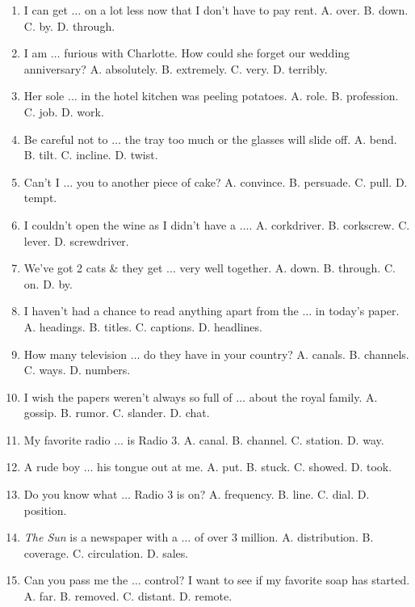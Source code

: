 \documentclass{article}
\numberwithin{equation}{section}
\begin{document}
\begin{enumerate}[leftmargin=8mm]
	\item I can get $\ldots$ on a lot less now that I don't have to pay rent. {\sf A.} over. {\sf B.} down. {\sf C.} by. {\sf D.} through.
	\item I am $\ldots$ furious with Charlotte. How could she forget our wedding anniversary? {\sf A.} absolutely. {\sf B.} extremely. {\sf C.} very. {\sf D.} terribly.
	\item Her sole $\ldots$ in the hotel kitchen was peeling potatoes. {\sf A.} role. {\sf B.} profession. {\sf C.} job. {\sf D.} work.
	\item Be careful not to $\ldots$ the tray too much or the glasses will slide off. {\sf A.} bend. {\sf B.} tilt. {\sf C.} incline. {\sf D.} twist.
	\item Can't I $\ldots$ you to another piece of cake? {\sf A.} convince. {\sf B.} persuade. {\sf C.} pull. {\sf D.} tempt.
	\item I couldn't open the wine as I didn't have a $\ldots$. {\sf A.} corkdriver. {\sf B.} corkscrew. {\sf C.} lever. {\sf D.} screwdriver.
	\item We've got 2 cats \& they get $\ldots$ very well together. {\sf A.} down. {\sf B.} through. {\sf C.} on. {\sf D.} by.
	\item I haven't had a chance to read anything apart from the $\ldots$ in today's paper. {\sf A.} headings. {\sf B.} titles. {\sf C.} captions. {\sf D.} headlines.
	\item How many television $\ldots$ do they have in your country? {\sf A.} canals. {\sf B.} channels. {\sf C.} ways. {\sf D.} numbers.
	\item I wish the papers weren't always so full of $\ldots$ about the royal family. {\sf A.} gossip. {\sf B.} rumor. {\sf C.} slander. {\sf D.} chat.
	\item My favorite radio $\ldots$ is Radio 3. {\sf A.} canal. {\sf B.} channel. {\sf C.} station. {\sf D.} way.
	\item A rude boy $\ldots$ his tongue out at me. {\sf A.} put. {\sf B.} stuck. {\sf C.} showed. {\sf D.} took.
	\item Do you know what $\ldots$ Radio 3 is on? {\sf A.} frequency. {\sf B.} line. {\sf C.} dial. {\sf D.} position.
	\item \textit{The Sun} is a newspaper with a $\ldots$ of over 3 million. {\sf A.} distribution. {\sf B.} coverage. {\sf C.} circulation. {\sf D.} sales.
	\item Can you pass me the $\ldots$ control? I want to see if my favorite soap has started. {\sf A.} far. {\sf B.} removed. {\sf C.} distant. {\sf D.} remote.

\end{enumerate}
\end{document}
